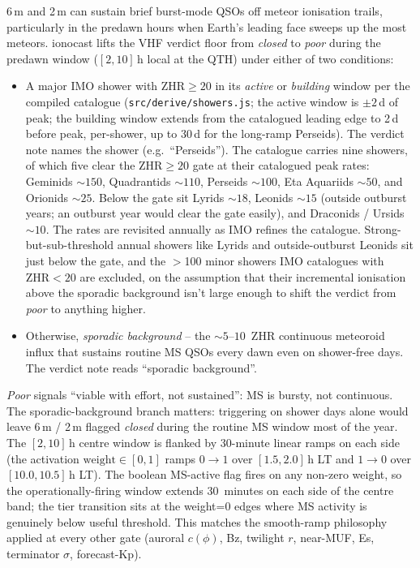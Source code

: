 \documentclass[11pt,a4paper]{article}
\begin{document}
6\,m and 2\,m can sustain brief burst-mode QSOs off meteor ionisation
trails, particularly in the predawn hours when Earth's leading face
sweeps up the most meteors.  ionocast lifts the VHF verdict floor
from \emph{closed} to \emph{poor} during the predawn window
($[2, 10]\,\text{h}$ local at the QTH) under either of two
conditions:
\begin{itemize}[nosep]
  \item A major IMO shower with $\text{ZHR} \geq 20$ in its
        \emph{active} or \emph{building} window per the compiled
        catalogue (\texttt{src/derive/showers.js}; the active
        window is $\pm 2$\,d of peak; the
        building window extends from the catalogued leading edge
        to 2\,d before peak, per-shower, up to 30\,d for the
        long-ramp Perseids).  The verdict note names the shower
        (e.g.\ ``Perseids'').  The catalogue carries nine
        showers, of which five clear the
        $\text{ZHR} \geq 20$ gate at their catalogued peak rates:
        Geminids ${\sim}\!150$,
        Quadrantids ${\sim}\!110$, Perseids ${\sim}\!100$,
        Eta Aquariids ${\sim}\!50$, and Orionids ${\sim}\!25$.
        Below the gate sit Lyrids ${\sim}\!18$,
        Leonids ${\sim}\!15$ (outside outburst years; an
        outburst year would clear the gate easily), and
        Draconids / Ursids ${\sim}\!10$.
        The rates are revisited annually as IMO refines the
        catalogue.  Strong-but-sub-threshold annual showers like
        Lyrids and outside-outburst Leonids sit just below the
        gate, and the $>$100 minor showers IMO catalogues with
        $\text{ZHR} < 20$ are excluded, on the assumption that
        their incremental ionisation above the sporadic background
        isn't large enough to shift the verdict from \emph{poor}
        to anything higher.
  \item Otherwise, \emph{sporadic background} -- the
        ${\sim}5\text{--}10$~ZHR continuous meteoroid influx that
        sustains routine MS QSOs every dawn even on shower-free
        days.  The verdict note reads ``sporadic background''.
\end{itemize}
\emph{Poor} signals ``viable with effort, not sustained'': MS is
bursty, not continuous.  The sporadic-background branch matters:
triggering on shower days alone would leave 6\,m / 2\,m flagged
\emph{closed} during the routine MS window most of the year.  The
$[2, 10]\,\text{h}$ centre window is flanked by 30-minute linear
ramps on each side (the activation $\text{weight} \in [0,1]$ ramps
$0 \to 1$ over $[1.5, 2.0]\,\text{h}$ LT and $1 \to 0$ over
$[10.0, 10.5]\,\text{h}$ LT).  The boolean MS-active flag fires on
any non-zero weight, so the operationally-firing window extends
30~minutes on each side of the centre band; the tier transition
sits at the weight=0 edges where MS
activity is genuinely below useful threshold.  This matches the
smooth-ramp philosophy applied at every other gate (auroral
$c(\phi)$, Bz, twilight $r$, near-MUF, Es, terminator $\sigma$,
forecast-Kp).
\end{document}
